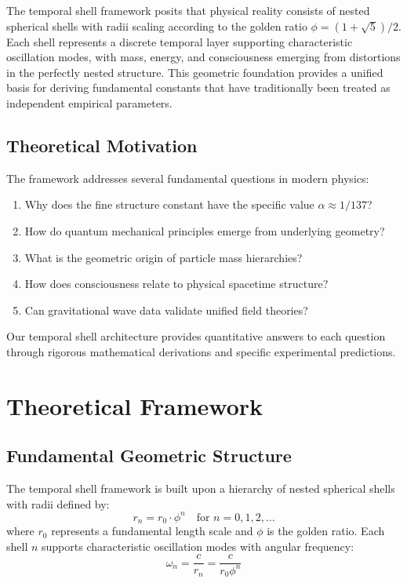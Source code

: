 \documentclass[12pt,a4paper]{article}
\theoremstyle{plain}
\theoremstyle{definition}
\begin{document}
The temporal shell framework posits that physical reality consists of nested spherical shells with radii scaling according to the golden ratio $\phi = (1+\sqrt{5})/2$. Each shell represents a discrete temporal layer supporting characteristic oscillation modes, with mass, energy, and consciousness emerging from distortions in the perfectly nested structure. This geometric foundation provides a unified basis for deriving fundamental constants that have traditionally been treated as independent empirical parameters.

\subsection{Theoretical Motivation}

The framework addresses several fundamental questions in modern physics:
\begin{enumerate}
\item Why does the fine structure constant have the specific value $\alpha \approx 1/137$?
\item How do quantum mechanical principles emerge from underlying geometry?
\item What is the geometric origin of particle mass hierarchies?
\item How does consciousness relate to physical spacetime structure?
\item Can gravitational wave data validate unified field theories?
\end{enumerate}

Our temporal shell architecture provides quantitative answers to each question through rigorous mathematical derivations and specific experimental predictions.

\section{Theoretical Framework}

\subsection{Fundamental Geometric Structure}

The temporal shell framework is built upon a hierarchy of nested spherical shells with radii defined by:
\begin{equation}
r_n = r_0 \cdot \phi^n \quad \text{for } n = 0, 1, 2, \ldots
\end{equation}
where $r_0$ represents a fundamental length scale and $\phi$ is the golden ratio. Each shell $n$ supports characteristic oscillation modes with angular frequency:
\begin{equation}
\omega_n = \frac{c}{r_n} = \frac{c}{r_0 \phi^n}
\end{equation}
\end{document}
